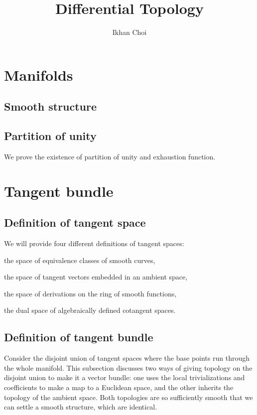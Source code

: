 \documentclass{../note}
\begin{document}
\title{Differential Topology}
\author{Ikhan Choi}
\maketitle
\tableofcontents




\chapter{Manifolds}
\section{Smooth structure}


\section{Partition of unity}
We prove the existence of partition of unity and exhaustion function.








\chapter{Tangent bundle}

\section{Definition of tangent space}
We will provide four different definitions of tangent spaces:
\begin{parts}
\item the space of equivalence classes of smooth curves,
\item the space of tangent vectors embedded in an ambient space,
\item the space of derivations on the ring of smooth functions,
\item the dual space of algebraically defined cotangent spaces.
\end{parts}


\section{Definition of tangent bundle}
Consider the disjoint union of tangent spaces where the base points run through the whole manifold.
This subsection discusses two ways of giving topology on the disjoint union to make it a vector bundle: one uses the local trivializations and coefficients to make a map to a Euclidean space, and the other inherits the topology of the ambient space.
Both topologies are so sufficiently smooth that we can settle a smooth structure, which are identical.
\end{document}
